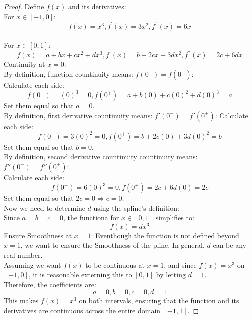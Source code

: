 \documentclass{article}
\begin{document}
\begin{proof}
    Define $f(x)$ and its derivatives:
    \\
    For $x \in [-1, 0]$:
    \[ f(x) = x^3, f^{'}(x) = 3x^2, f^{''}(x) = 6x \]
    \\
    For $x \in [0,1]$:
    \[ f(x) = a + bx + cx^2 + dx^3, f^{'}(x) = b + 2cx + 3dx^2, f^{''}(x) = 2c + 6dx \]
    Continuity at $x = 0$:
    \\
    By definition, function countinuity means: $f(0^{-}) = f(0^{+})$:
    \\
    Calculate each side:
    \[ f(0^{-}) = (0)^3 = 0, f(0^{+}) = a + b(0) + c(0)^2 + d(0)^3 = a \]
    Set them equal so that $a = 0$.
    \\
    By definition, first derivative countinuity means: $f{'}(0^{-}) = f{'}(0^{+})$:
    Calculate each side:
    \[ f(0^{-}) = 3(0)^2 = 0, f(0^{+}) = b + 2c(0) + 3d(0)^2 = b \]
    Set them equal so that $b = 0$.
    \\
    By definition, second derivative countinuity countinuity means: $f{''}(0^{-}) = f{''}(0^{+})$:
    \\
    Calculate each side:
    \[ f(0^{-}) = 6(0)^3 = 0, f(0^{+}) = 2c + 6d(0) = 2c \]
    Set them equal so that $2c = 0 \Rightarrow c = 0$.
    \\
    Now we need to determine $d$ using the spline's definition:
    \\
    Since $a = b = c = 0$, the functiona for $x \in [0,1]$ simplifies to:
    \[ f(x) = dx^3 \]
    Ensure Smoothness at $x = 1$:
    Eventhough the function is not defined beyond $x = 1$, we want to ensure the Smoothness of the pline. 
    In general, $d$ can be any real number.
    \\
    Assuming we want $f(x)$ to be continuous at $x = 1$, and since $f(x) = x^3$ on $[-1, 0]$, it is reasonable externing this to $[0,1]$ by letting $d = 1$.
    \\
    Therefore, the coefficients are:
    \[ a = 0, b = 0, c = 0, d = 1 \]
    This makes $f(x) = x^3$ on both intervals, ensuring that the function and its derivatives are continuous across the entire domain $[-1, 1]$.
\end{proof}
\end{document}
